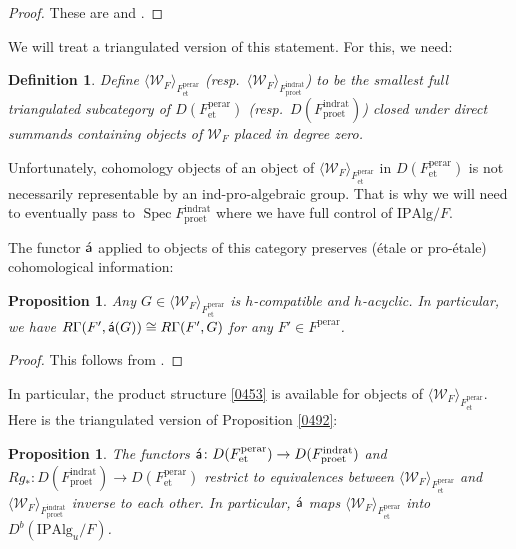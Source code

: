 \documentclass{amsart}
\newtheorem{Prop}[Thm]{Proposition}
\newtheorem{Def}[Thm]{Definition}
\theoremstyle{remark}
\numberwithin{equation}{subsection}
\newcommand{\et}{\mathrm{et}}
\newcommand{\rat}{\mathrm{rat}}
\newcommand{\ind}{\mathrm{ind}}
\newcommand{\pro}{\mathrm{pro}}
\newcommand{\perar}{\mathrm{perar}}
\newcommand{\Alg}{\mathrm{Alg}}
\newcommand{\Ind}{\mathrm{I}}
\newcommand{\Pro}{\mathrm{P}}
\newcommand{\algebrize}{\Acute{\mathsf{a}}}
\newcommand{\genby}[1]{\langle #1 \rangle}
\DeclareMathOperator{\Spec}{Spec}
\begin{document}
\begin{proof}
	These are \cite[Proposition 7.9 (b)]{Suz21} and \cite[Proposition (2.4.2)]{Suz20}.
\end{proof}

We will treat a triangulated version of this statement.
For this, we need:

\begin{Def} \label{0151}
	Define $\genby{\mathcal{W}_{F}}_{F^{\perar}_{\et}}$
	(resp.\ $\genby{\mathcal{W}_{F}}_{F^{\ind\rat}_{\pro\et}}$)
	to be the smallest full triangulated subcategory of
	$D(F^{\perar}_{\et})$ (resp.\ $D(F^{\ind\rat}_{\pro\et})$)
	closed under direct summands containing objects of $\mathcal{W}_{F}$ placed in degree zero.
\end{Def}

Unfortunately, cohomology objects of an object of $\genby{\mathcal{W}_{F}}_{F^{\perar}_{\et}}$
in $D(F^{\perar}_{\et})$
is not necessarily representable by an ind-pro-algebraic group.
That is why we will need to eventually pass to $\Spec F^{\ind\rat}_{\pro\et}$
where we have full control of $\Ind \Pro \Alg / F$.

The functor $\algebrize$ applied to objects of this category preserves
(\'etale or pro-\'etale) cohomological information:

\begin{Prop} \label{0153}
	Any $G \in \genby{\mathcal{W}_{F}}_{F^{\perar}_{\et}}$ is
	$h$-compatible and $h$-acyclic.
	In particular, we have
	$R \Gamma(F', \algebrize(G)) \cong R \Gamma(F', G)$
	for any $F' \in F^{\perar}$.
\end{Prop}

\begin{proof}
	This follows from \cite[Proposition 7.2 and Proposition 7.10]{Suz21}.
\end{proof}

In particular, the product structure \eqref{0453} is available
for objects of $\genby{\mathcal{W}_{F}}_{F^{\perar}_{\et}}$.
Here is the triangulated version of Proposition \ref{0492}:

\begin{Prop} \label{0152}
	The functors $\algebrize \colon D(F^{\perar}_{\et}) \to D(F^{\ind\rat}_{\pro\et})$ and
	$R g_{\ast} \colon D(F^{\ind\rat}_{\pro\et}) \to D(F^{\perar}_{\et})$
	restrict to equivalences between
	$\genby{\mathcal{W}_{F}}_{F^{\perar}_{\et}}$
	and $\genby{\mathcal{W}_{F}}_{F^{\ind\rat}_{\pro\et}}$
	inverse to each other.
	In particular, $\algebrize$ maps
	$\genby{\mathcal{W}_{F}}_{F^{\perar}_{\et}}$
	into $D^{b}(\Ind \Pro \Alg_{u} / F)$.
\end{Prop}
\end{document}
